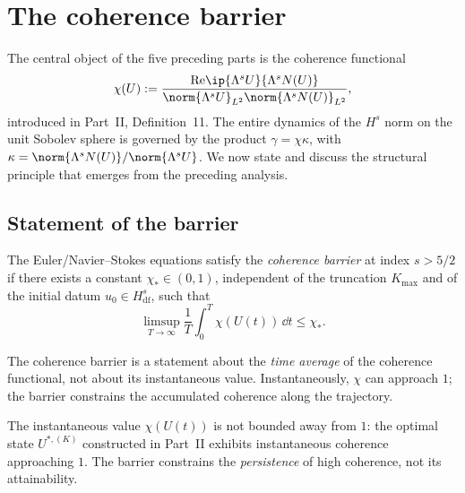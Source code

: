 \section{The coherence barrier}
\label{part-6:sec:coherence-barrier}

The central object of the five preceding parts is the coherence 
functional
\begin{equation}\label{part-6:eq:chi-general}
\chi(U) := \frac{\mathrm{Re}\ip{\Lambda^s U}{\Lambda^s N(U)}}
                {\norm{\Lambda^s U}_{L^2}\norm{\Lambda^s N(U)}_{L^2}},
\end{equation}
introduced in Part~II, Definition~11. The entire dynamics of the 
$H^s$ norm on the unit Sobolev sphere is governed by the product 
$\gamma = \chi\kappa$, with $\kappa = \norm{\Lambda^s N(U)}/
\norm{\Lambda^s U}$. We now state and discuss the structural 
principle that emerges from the preceding analysis.

\subsection{Statement of the barrier}
\label{part-6:ssec:statement-barrier}

\begin{definition}\label{part-6:def:barrier}
The Euler/Navier--Stokes equations satisfy the 
\emph{coherence barrier} at index $s>5/2$ if there exists a constant 
$\chi_\ast\in(0,1)$, independent of the truncation $K_{\max}$ and of 
the initial datum $u_0\in H^s_{\mathrm{df}}$, such that
\begin{equation}\label{part-6:eq:barrier-inequality}
\boxed{
\limsup_{T\to\infty}\frac{1}{T}\int_0^T\chi(U(t))\,\dd t 
\leq \chi_\ast.
}
\end{equation}
\end{definition}

The coherence barrier is a statement about the \emph{time average} 
of the coherence functional, not about its instantaneous value. 
Instantaneously, $\chi$ can approach $1$; the barrier constrains the 
accumulated coherence along the trajectory.

\begin{remark}\label{part-6:rem:why-average}
The instantaneous value $\chi(U(t))$ is not bounded away from $1$: 
the optimal state $U^{\ast,(K)}$ constructed in Part~II exhibits 
instantaneous coherence approaching $1$. The barrier constrains the 
\emph{persistence} of high coherence, not its attainability.
\end{remark}

